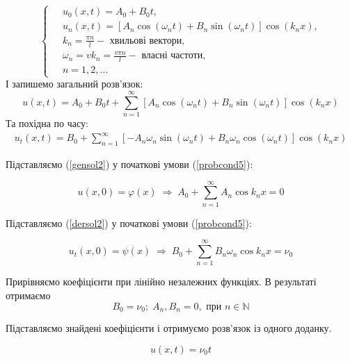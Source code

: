 \begin{equation}
    \left\{ \begin{aligned} \label{fullsol2}
        \;&u_0(x,t) = A_0 + B_0 t, \\
        &u_n(x,t) = \left[A_n\cos(\omega_n t) + B_n\sin(\omega_n t)\right] \cos(k_n x), \\
        &k_n = \frac{\pi n}{l} - \text{ хвильові вектори}, \\
        &\omega_n = vk_n = \frac{v \pi n}{l} - \text{ власні частоти}, \\
        &n = 1, 2,\ldots
    \end{aligned}\right.
\end{equation}
І запишемо загальний розв'язок:
\begin{equation} \label{gensol2}
    u(x,t) = A_0 + B_0 t + \sum^{\infty}_{n=1} \left[A_n\cos(\omega_n t) + B_n\sin(\omega_n t)\right] \cos(k_n x)
\end{equation}
Та похідна по часу:
\begin{equation} \label{dersol2}
    \begin{aligned}
        u_t(x,t) = B_0 + \sum^{\infty}_{n=1}\left[-A_n\omega_n\sin(\omega_n t) + B_n\omega_n\cos(\omega_n t)\right] \cos(k_n x)  
    \end{aligned}
\end{equation}

Підставляємо (\ref{gensol2}) у початкові умови (\ref{probcond5}):

\begin{equation} \label{sol-init-pos}
    u(x,0) = \varphi(x) \;\Rightarrow\; A_0 + \sum^{\infty}_{n=1} A_n\cos k_nx = 0
\end{equation}


Підставляємо (\ref{dersol2}) у початкові умови (\ref{probcond5}):

\begin{equation} \label{sol-init-pos}
    u_t(x,0) = \psi(x) \;\Rightarrow\; B_0 + \sum^{\infty}_{n=1} B_n \omega_n \cos k_nx = \nu_0     
\end{equation}

Прирівняємо коефіцієнти при лінійно незалежних функціях. В результаті отримаємо  \[B_0 = \nu_0;\; A_n, B_n = 0, \text{ при } n \in \mathbb{N}\]

Підставляємо знайдені коефіцієнти і отримуємо розв'язок із одного доданку.

\begin{equation}
    u (x,t) = \nu_0 t 
\end{equation}

